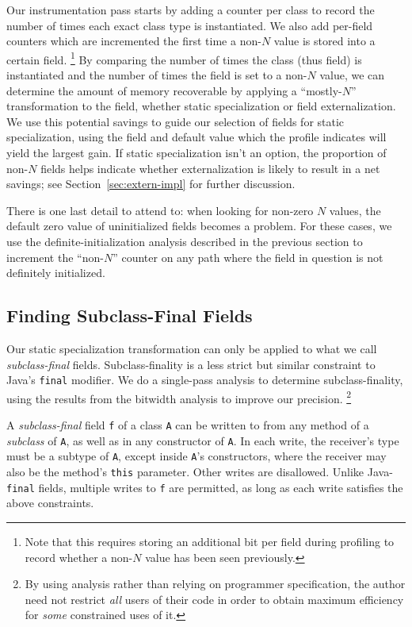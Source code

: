 \documentclass{acmconf}
\begin{document}
Our instrumentation pass starts by
adding a counter per class
to record the number of times each exact class type is instantiated.
We also add per-field counters which are incremented the first
time a non-$N$ value is stored into a certain field.%
\footnote{Note that this requires storing an additional bit per field
  during profiling
  to record whether a non-$N$ value has been seen previously.}
By comparing the
number of times the class (thus field) is instantiated and the number
of times the field is set to a non-$N$ value, we can determine the
amount of memory recoverable by applying a ``mostly-$N$''
transformation to the field, whether static specialization or field
externalization.  We use this potential savings to guide our selection
of fields for static specialization, using the field and default value
which the profile indicates will yield the largest gain.  If static
specialization isn't an option, the
proportion of non-$N$ fields helps indicate whether externalization is
likely to result in a net savings; see Section~\ref{sec:extern-impl}
for further discussion.

There is one last detail to attend to:  when looking for non-zero $N$
values, the default zero value of
uninitialized fields becomes a problem.  For these cases, we use the
definite-initialization analysis described in the previous section to
increment the
``non-$N$'' counter on any path where the field in question is not
definitely initialized.

\subsection{Finding Subclass-Final Fields}
\label{sec:subclass-final}
Our static specialization transformation can only be applied to what
we call {\it subclass-final} fields.  Subclass-finality is a less strict
but similar constraint to Java's {\tt final} modifier.  We do a
single-pass analysis to determine subclass-finality, using the results
from the bitwidth analysis to improve our precision.%
\footnote{By using analysis rather than relying on programmer
  specification, the author need not restrict \emph{all} users of
  their code in order to obtain maximum efficiency for \emph{some}
  constrained uses of it.}

A \emph{subclass-final} field {\tt f} of a class {\tt A} can be
written to from any method of a \emph{subclass} of {\tt A}, as well as
in any constructor of {\tt A}.  In each write, the receiver's type
must be a subtype of {\tt A}, except inside {\tt A}'s constructors,
where the receiver may also be the method's {\tt this} parameter.
Other writes are disallowed.  Unlike Java-{\tt final} fields,
multiple writes to {\tt f} are permitted, as long as each write
satisfies the above constraints.
\end{document}
